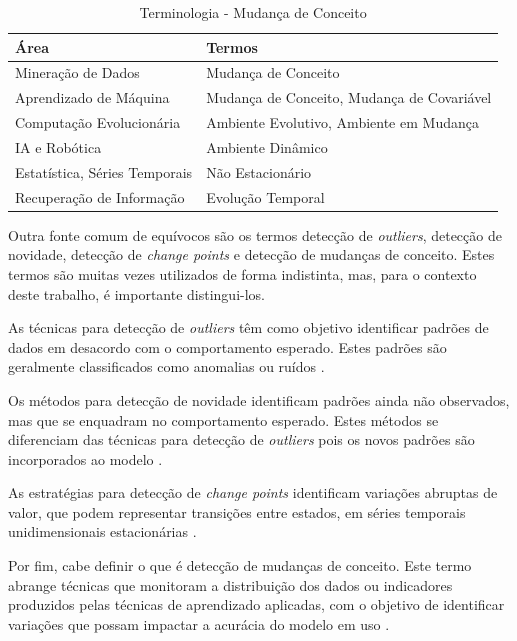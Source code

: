 \documentclass[msc, classic, a4paper]{ufbathesis}
\begin{document}
\begin{table}[ht]
    \caption{Terminologia - Mudança de Conceito \cite{Zliobaite:2010}}
    \label{tbl:taxonomy}
    \centering
    
    \begin{tabularx}{\textwidth}{ l l }
    \toprule
    Área & Termos \\
    \midrule
    Mineração de Dados                  & Mudança de Conceito                        \\
    Aprendizado de Máquina              & Mudança de Conceito, Mudança de Covariável \\
    Computação Evolucionária            & Ambiente Evolutivo, Ambiente em Mudança    \\
    IA e Robótica                       & Ambiente Dinâmico                          \\
    Estatística, Séries Temporais      & Não Estacionário                           \\
    Recuperação de Informação           & Evolução Temporal                          \\
    \bottomrule
    \end{tabularx}
\end{table}

Outra fonte comum de equívocos são os termos detecção de \textit{outliers}, detecção de novidade, detecção de \textit{change points} e detecção de mudanças de conceito.
Estes termos são muitas vezes utilizados de forma indistinta, mas, para o contexto deste trabalho, é importante distingui-los.

As técnicas para detecção de \textit{outliers} têm como objetivo identificar padrões de dados em desacordo com o comportamento esperado. Estes padrões são geralmente classificados como anomalias ou ruídos \cite{Chandola:2009:ADS:1541880.1541882}.

Os métodos para detecção de novidade identificam padrões ainda não observados, mas que se enquadram no comportamento esperado.
Estes métodos se diferenciam das técnicas para detecção de \textit{outliers} pois os novos padrões são incorporados ao modelo \cite{Chandola:2009:ADS:1541880.1541882}.

As estratégias para detecção de \textit{change points} identificam variações abruptas de valor, que podem representar transições entre estados, em séries temporais unidimensionais estacionárias \cite{Aminikhanghahi:2017:SMT:3086013.3086037}.

Por fim,  cabe definir o que é detecção de mudanças de conceito.
Este termo abrange técnicas que monitoram a distribuição dos dados ou indicadores produzidos pelas técnicas de aprendizado aplicadas, com o objetivo de identificar variações que possam impactar a acurácia do modelo em uso \cite{Gama:2014:SCD:2597757.2523813}.
\end{document}
